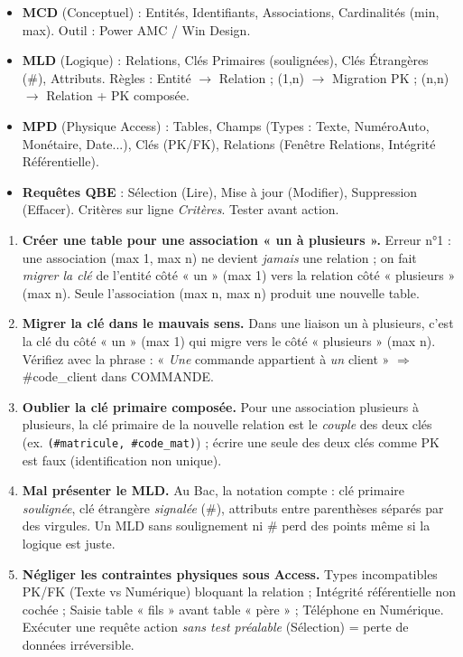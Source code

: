 \documentclass[11pt]{article}
\begin{document}
\begin{aretenir}
\begin{itemize}
\item \textbf{MCD} (Conceptuel) : Entités, Identifiants, Associations, Cardinalités (min, max). Outil : Power AMC / Win Design.
\item \textbf{MLD} (Logique) : Relations, Clés Primaires (soulignées), Clés Étrangères (\#), Attributs. Règles : Entité $\to$ Relation ; (1,n) $\to$ Migration PK ; (n,n) $\to$ Relation + PK composée.
\item \textbf{MPD} (Physique Access) : Tables, Champs (Types : Texte, NuméroAuto, Monétaire, Date...), Clés (PK/FK), Relations (Fenêtre Relations, Intégrité Référentielle).
\item \textbf{Requêtes QBE} : Sélection (Lire), Mise à jour (Modifier), Suppression (Effacer). Critères sur ligne \emph{Critères}. Tester avant action.
\end{itemize}
\end{aretenir}

\begin{attention}
\begin{enumerate}
\item \textbf{Créer une table pour une association « un à plusieurs ».} Erreur n°1 : une association (max 1, max n) ne devient \emph{jamais} une relation ; on fait \emph{migrer la clé} de l'entité côté « un » (max 1) vers la relation côté « plusieurs » (max n). Seule l'association (max n, max n) produit une nouvelle table.
\item \textbf{Migrer la clé dans le mauvais sens.} Dans une liaison un à plusieurs, c'est la clé du côté « un » (max 1) qui migre vers le côté « plusieurs » (max n). Vérifiez avec la phrase : « \emph{Une} commande appartient à \emph{un} client » $\Rightarrow$ \#code\_client dans COMMANDE.
\item \textbf{Oublier la clé primaire composée.} Pour une association plusieurs à plusieurs, la clé primaire de la nouvelle relation est le \emph{couple} des deux clés (ex. \texttt{(\#matricule, \#code\_mat)}) ; écrire une seule des deux clés comme PK est faux (identification non unique).
\item \textbf{Mal présenter le MLD.} Au Bac, la notation compte : clé primaire \emph{soulignée}, clé étrangère \emph{signalée} (\#), attributs entre parenthèses séparés par des virgules. Un MLD sans soulignement ni \# perd des points même si la logique est juste.
\item \textbf{Négliger les contraintes physiques sous Access.} Types incompatibles PK/FK (Texte vs Numérique) bloquant la relation ; Intégrité référentielle non cochée ; Saisie table « fils » avant table « père » ; Téléphone en Numérique. Exécuter une requête action \emph{sans test préalable} (Sélection) = perte de données irréversible.
\end{enumerate}
\end{attention}
\end{document}
